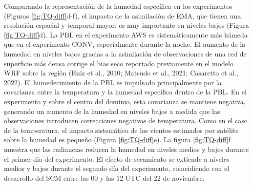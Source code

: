 \documentclass[12pt,oneside,a4paper]{reedthesis}
\begin{document}
Comparando la representación de la humedad específica en los experimentos (Figuras \ref{fig:TQ-diff}d-f), el impacto de la asimilación de EMA, que tienen una resolución espacial y temporal mayor, es muy importante en niveles bajos (Figura \ref{fig:TQ-diff}d). La PBL en el experimento AWS es sistemáticamente más húmeda que en el experimento CONV, especialmente durante la noche. El aumento de la humedad en niveles bajos gracias a la asimilación de observaciones de una red de superficie más densa corrige el bias seco reportado previamente en el modelo WRF sobre la región (Ruiz et al., 2010; Matsudo et al., 2021; Casaretto et al., 2022). El humedecimiento de la PBL es impulsado principalmente por la covarianza entre la temperatura y la humedad específica dentro de la PBL. En el experimento y sobre el centro del dominio, esta covarianza se mantiene negativa, generando un aumento de la humedad en niveles bajos a medida que las observaciones introducen correcciones negativas de temperatura. Como en el caso de la temperatura, el impacto sistemático de los vientos estimados por satélite sobre la humedad es pequeño (Figura \ref{fig:TQ-diff}e). La figura \ref{fig:TQ-diff}f muestra que las radiancias reducen la humedad en niveles medios y bajos durante el primer día del experimento. El efecto de secamiento se extiende a niveles medios y bajos durante el segundo día del experimento, coincidiendo con el desarrollo del SCM entre las 00 y las 12 UTC del 22 de noviembre.
\end{document}
